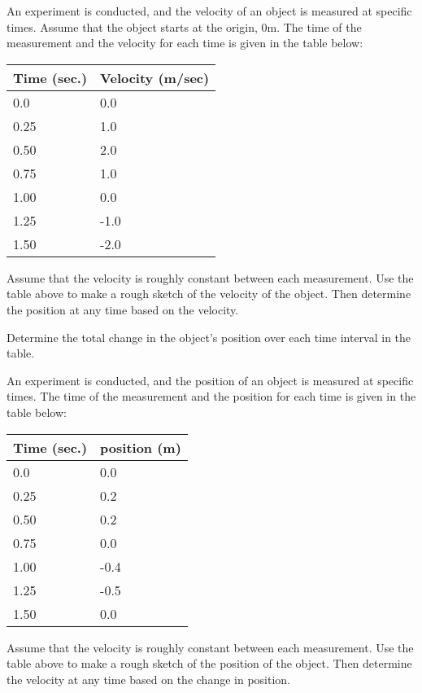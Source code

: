 \begin{problem}
\item An experiment is conducted, and the velocity of an object is
  measured at specific times. Assume that the object starts at the
  origin, 0m. The time of the measurement and the
  velocity for each time is given in the table below: \\
  \begin{tabular}{ll}
    Time (sec.) & Velocity (m/sec) \\ \hline
    0.0  & 0.0 \\
    0.25 & 1.0 \\
    0.50 & 2.0 \\
    0.75 & 1.0 \\
    1.00 & 0.0 \\
    1.25 & -1.0 \\
    1.50 & -2.0
  \end{tabular}
  \begin{subproblem}
  \item Assume that the velocity is roughly constant between each
    measurement. Use the table above to make a rough sketch of the
    velocity of the object. Then determine the position at any time
    based on the velocity.

    \scalebox{0.8}{}

  \item Determine the total change in the object's position over each
    time interval in the table.

    \vfill

  \end{subproblem}

  \clearpage

\item An experiment is conducted, and the position of an object is
  measured at specific times. The time of the measurement and the
  position for each time is given in the table below: \\
  \begin{tabular}{ll}
    Time (sec.) & position (m) \\ \hline
    0.0  & 0.0 \\
    0.25 & 0.2 \\
    0.50 & 0.2 \\
    0.75 & 0.0 \\
    1.00 & -0.4 \\
    1.25 & -0.5 \\
    1.50 & 0.0
  \end{tabular}
  \begin{subproblem}
  \item Assume that the velocity is roughly constant between each
    measurement. Use the table above to make a rough sketch of the
    position of the object. Then determine the velocity at any time
    based on the change in position.


\end{subproblem}
\end{problem}
